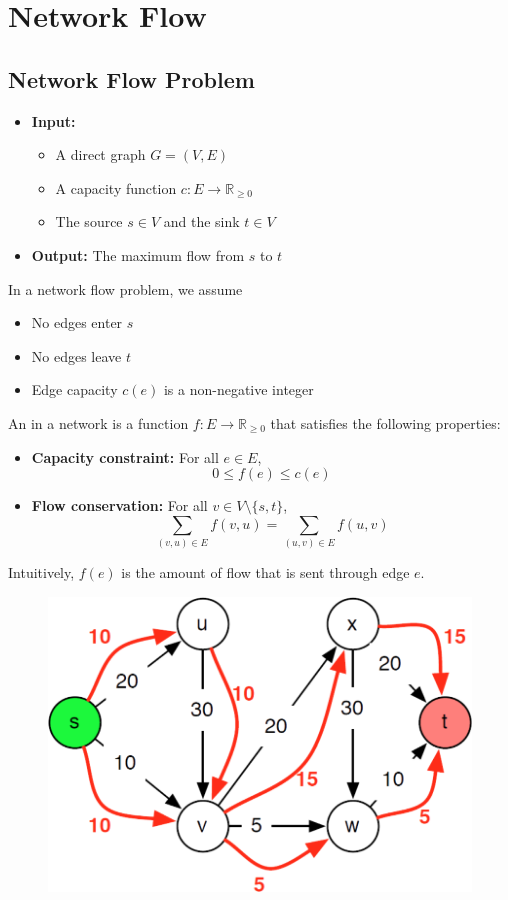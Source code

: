 \chapter{Network Flow}

\section{Network Flow Problem}

\begin{itemize}
    \item \textbf{Input:}

    \begin{itemize}
        \item A direct graph $G = (V, E)$
        \item A capacity function $c: E \to \mathbb{R}_{\ge0}$
        \item The source $s \in V$ and the sink $t \in V$
    \end{itemize}

    \item \textbf{Output:} The maximum flow from $s$ to $t$
\end{itemize}

In a network flow problem, we assume
\begin{itemize}
    \item No edges enter $s$
    \item No edges leave $t$
    \item Edge capacity $c(e)$ is a non-negative integer
\end{itemize}

\begin{definition}[Flow]\label{def:flow}
    An  in a network is a function $f: E \to \mathbb{R}_{\ge 0}$ that satisfies the following properties:
    \begin{itemize}
        \item \textbf{Capacity constraint:} For all $e \in E$, \[ 0 \leq f(e) \leq c(e) \]
        \item \textbf{Flow conservation:} For all $v \in V \setminus \{s, t\}$, \[ \sum_{(v, u) \in E} f(v, u) = \sum_{(u, v) \in E} f(u, v) \]
    \end{itemize}

    Intuitively, $f(e)$ is the amount of flow that is sent through edge $e$.
\end{definition}

\begin{figure}[ht!]
    \centering
    \includegraphics[width=0.33\linewidth]{figures/flow-definition.png}
\end{figure}

